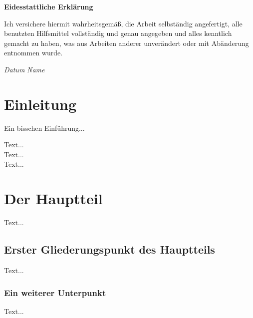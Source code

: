 \documentclass[12pt,a4paper,twoside]{article}
\theoremstyle{definition}
\numberwithin{equation}{section}
\begin{document}
\cleardoublepage
\vspace*{1cm}

{\Large \textbf{Eidesstattliche Erklärung}} 

\bigskip

Ich versichere hiermit wahrheitsgemäß, die Arbeit selbständig angefertigt, alle benutzten Hilfsmittel vollständig und genau angegeben und alles kenntlich gemacht zu haben, was aus Arbeiten anderer unverändert oder mit Abänderung entnommen wurde.\\
\vspace{1cm}

\textit{Datum} \hspace{8cm} \textit{Name}

\cleardoublepage
\rmfamily \pagestyle{fancy}
\renewcommand{\sectionmark}[1]{\markright{\thesection\ #1}}
\setcounter{secnumdepth}{4}
 \setcounter{page}{3} 
\tableofcontents
{} \setcounter{roemisch}{\value{page}}
\clearpage
\mbox{}\thispagestyle{empty}\clearpage
\setcounter{page}{2} 
\section{Einleitung}
Ein bisschen Einführung...
\vspace{\baselineskip}

Text... \\
Text... \\
Text...

\newpage

\section{Der Hauptteil}
Text...

\subsection{Erster Gliederungspunkt des Hauptteils}
Text...

\subsubsection{Ein weiterer Unterpunkt}
Text...
\end{document}
